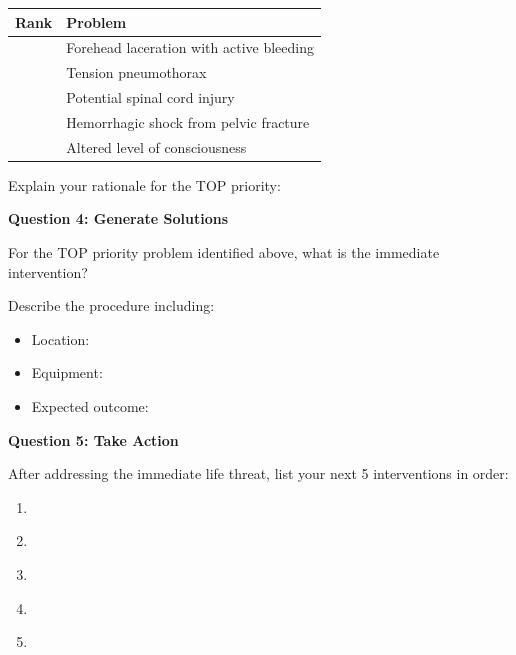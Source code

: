 \documentclass[11pt]{article}
\begin{document}
\begin{tabular}{|c|p{10cm}|}
\hline
\textbf{Rank} & \textbf{Problem} \\
\hline
\underline{\hspace{1cm}} & Forehead laceration with active bleeding \\
\hline
\underline{\hspace{1cm}} & Tension pneumothorax \\
\hline
\underline{\hspace{1cm}} & Potential spinal cord injury \\
\hline
\underline{\hspace{1cm}} & Hemorrhagic shock from pelvic fracture \\
\hline
\underline{\hspace{1cm}} & Altered level of consciousness \\
\hline
\end{tabular}

\vspace{0.3cm}
Explain your rationale for the TOP priority:

\underline{\hspace{12cm}}

\underline{\hspace{12cm}}

\vspace{0.5cm}
\textbf{Question 4: Generate Solutions}

For the TOP priority problem identified above, what is the immediate intervention?

\underline{\hspace{12cm}}

Describe the procedure including:

\begin{itemize}
    \item Location: \underline{\hspace{8cm}}
    \item Equipment: \underline{\hspace{8cm}}
    \item Expected outcome: \underline{\hspace{8cm}}
\end{itemize}

\vspace{0.5cm}
\textbf{Question 5: Take Action}

After addressing the immediate life threat, list your next 5 interventions in order:

\begin{enumerate}
    \item \underline{\hspace{11cm}}
    \item \underline{\hspace{11cm}}
    \item \underline{\hspace{11cm}}
    \item \underline{\hspace{11cm}}
    \item \underline{\hspace{11cm}}
\end{enumerate}
\end{document}
